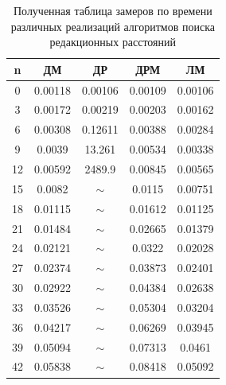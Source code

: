 \begin{table}[!ht]
	\label{t:timings}
	\centering
	\caption{Полученная таблица замеров по времени различных реализаций алгоритмов поиска редакционных расстояний}
	\begin{tabular}{|c|c|c|c|c|}
		\hline
		n  & ДМ & ДР & ДРМ & ЛМ \\
  \hline
	0  & 0.00118            & 0.00106               & 0.00109                     & 0.00106                \\  \hline
	3  & 0.00172            & 0.00219               & 0.00203                     & 0.00162                \\ \hline
	6  & 0.00308            & 0.12611               & 0.00388                     & 0.00284                \\ \hline
	9  & 0.0039             & 13.261                & 0.00534                     & 0.00338                \\ \hline
	12 & 0.00592            & 2489.9                & 0.00845                     & 0.00565                \\ \hline
	15 & 0.0082             & $\sim$                & 0.0115                      & 0.00751                \\ \hline
	18 & 0.01115            & $\sim$                & 0.01612                     & 0.01125                \\ \hline
	21 & 0.01484            & $\sim$                & 0.02665                     & 0.01379                \\ \hline
	24 & 0.02121            & $\sim$                & 0.0322                      & 0.02028                \\ \hline
	27 & 0.02374            & $\sim$                & 0.03873                     & 0.02401                \\ \hline
	30 & 0.02922            & $\sim$                & 0.04384                     & 0.02638                \\ \hline
	33 & 0.03526            & $\sim$                & 0.05304                     & 0.03204                \\ \hline
	36 & 0.04217            & $\sim$                & 0.06269                     & 0.03945                \\ \hline
	39 & 0.05094            & $\sim$                & 0.07313                     & 0.0461                 \\ \hline
	42 & 0.05838            & $\sim$                & 0.08418                     & 0.05092                \\ \hline

\end{tabular}
\end{table}
